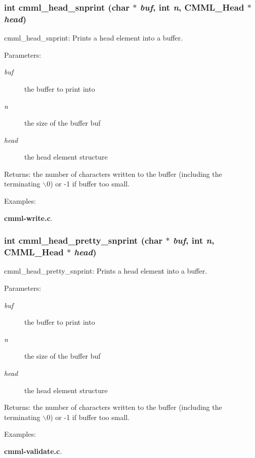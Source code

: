 \subsubsection{\setlength{\rightskip}{0pt plus 5cm}int cmml\_\-head\_\-snprint (char $\ast$ {\em buf}, int {\em n}, {\bf CMML\_\-Head} $\ast$ {\em head})}\label{cmml_8h_a77}


cmml\_\-head\_\-snprint: Prints a head element into a buffer.

\begin{Desc}
\item[Parameters:]
\begin{description}
\item[{\em buf}]the buffer to print into \item[{\em n}]the size of the buffer buf \item[{\em head}]the head element structure\end{description}
\end{Desc}
\begin{Desc}
\item[Returns:]the number of characters written to the buffer (including the terminating $\backslash$0) or -1 if buffer too small. \end{Desc}
\begin{Desc}
\item[Examples: ]\par
{\bf cmml-write.c}.\end{Desc}
\subsubsection{\setlength{\rightskip}{0pt plus 5cm}int cmml\_\-head\_\-pretty\_\-snprint (char $\ast$ {\em buf}, int {\em n}, {\bf CMML\_\-Head} $\ast$ {\em head})}\label{cmml_8h_a78}


cmml\_\-head\_\-pretty\_\-snprint: Prints a head element into a buffer.

\begin{Desc}
\item[Parameters:]
\begin{description}
\item[{\em buf}]the buffer to print into \item[{\em n}]the size of the buffer buf \item[{\em head}]the head element structure\end{description}
\end{Desc}
\begin{Desc}
\item[Returns:]the number of characters written to the buffer (including the terminating $\backslash$0) or -1 if buffer too small. \end{Desc}
\begin{Desc}
\item[Examples: ]\par
{\bf cmml-validate.c}.\end{Desc}
